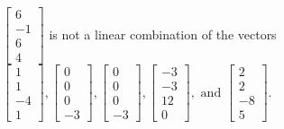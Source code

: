 \begin{exercise}
\begin{exerciseStatement}
  \end{exerciseStatement}
  \begin{exerciseAnswer}
   \(\left[\begin{array}{c}
6 \\
-1 \\
6 \\
4
\end{array}\right]\) 
  	 is not  
	a linear combination of the vectors \(\left[\begin{array}{c}
1 \\
1 \\
-4 \\
1
\end{array}\right] , \left[\begin{array}{c}
0 \\
0 \\
0 \\
-3
\end{array}\right] , \left[\begin{array}{c}
0 \\
0 \\
0 \\
-3
\end{array}\right] , \left[\begin{array}{c}
-3 \\
-3 \\
12 \\
0
\end{array}\right] , \text{ and } \left[\begin{array}{c}
2 \\
2 \\
-8 \\
5
\end{array}\right]\).

	
  


  \end{exerciseAnswer}
\end{exercise}